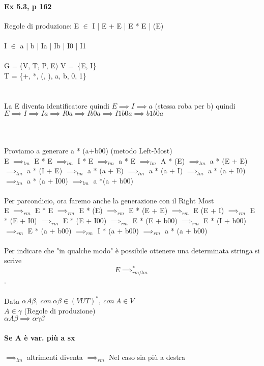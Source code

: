 \documentclass[12pt, a4paper, openany, oneside]{book}
\begin{document}
\paragraph{Ex 5.3, p 162}
Regole di produzione:
E $\in$ I | E + E | E * E | (E) \\ \\
I $\in$ a | b | Ia | Ib | I0 | I1 \\ \\
G = (V, T, P, E)      V = \{E, I\} \\
T = \{+, *, (, ), a, b, 0, 1\} \\ \\ \\
La E diventa identificatore quindi $E \implies I \implies a$ (stessa roba per b)
quindi $E \implies I \implies Ia \implies I0a \implies Ib0a \implies I1b0a 
\implies b1b0a$ 
\\ \\
\\ \\
Proviamo a generare a * (a+b00) (metodo Left-Most) \\
E $\implies _{lm}$ E * E $\implies _{lm}$ I * E $\implies _{lm}$ a * E
$\implies _{lm}$ A * (E) $\implies _{lm}$ a * (E + E) $\implies _{lm}$ a * 
(I + E) $\implies _{lm}$ a * (a + E) $\implies _{lm}$ a * (a + I) $\implies _{lm}$
a * (a + I0) $\implies _{lm}$ a * (a + I00) $\implies _{lm}$ a *(a + b00) \\ \\
Per parcondicio, ora faremo anche la generazione con il Right Most \\
E $\implies _{rm}$ E * E $\implies _{rm}$ E * (E) $\implies _{rm}$ E * (E + E)
$\implies _{rm}$ E (E + I) $\implies _{rm}$ E * (E + I0) $\implies _{rm}$ 
E * (E + I00) $\implies _{rm}$ E * (E + b00) $\implies _{rm}$ E * (I + b00)
$\implies _{rm}$ E * (a + b00) $\implies _{rm}$ I * (a + b00) $\implies _{rm}$ 
a * (a + b00) \\ \\
Per indicare che "in qualche modo" è possibile ottenere una determinata stringa
si scrive $$E \implies _{rm/lm}^{*}$$.
\\ \\ 
Data $\alpha A \beta, ~con~ \alpha \beta \in (V U T)^{*}, ~con~ A\in V$ \\
$A \in \gamma$ (Regole di produzione) \\
$\alpha A \beta \implies \alpha \gamma \beta$ 
\paragraph{Se A è var. più a sx} $\implies _{lm}$ altrimenti diventa 
$\implies _{rm}$ Nel caso sia più a destra
\\ \\
\end{document}
